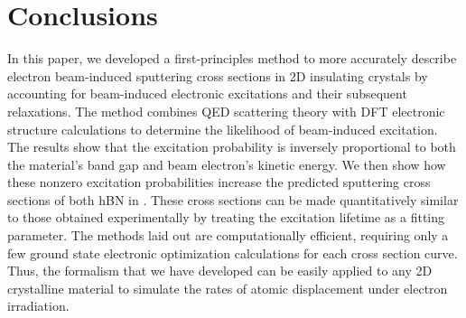 \documentclass[twoside,twocolumn,9pt]{article}
\begin{document}
\section{Conclusions}
\label{sec:conclusion}

In this paper, we developed a first-principles method to more accurately
describe electron beam-induced sputtering cross sections in 2D insulating
crystals by accounting for beam-induced electronic excitations and their
subsequent relaxations.
The method combines QED scattering theory with DFT electronic structure
calculations to determine the likelihood of beam-induced excitation.
The results show that the excitation probability is inversely proportional
to both the material's band gap and beam electron's kinetic energy.
We then show how these nonzero excitation probabilities increase the predicted
sputtering cross sections of both hBN in .  These cross sections can be
made quantitatively similar to those obtained experimentally by treating the
excitation lifetime as a fitting parameter.
The methods laid out are computationally efficient, requiring only a few
ground state electronic optimization calculations for each cross section curve.
Thus, the formalism that we have developed can be easily applied to any 2D
crystalline material to simulate the rates of atomic displacement under
electron irradiation.
\end{document}
